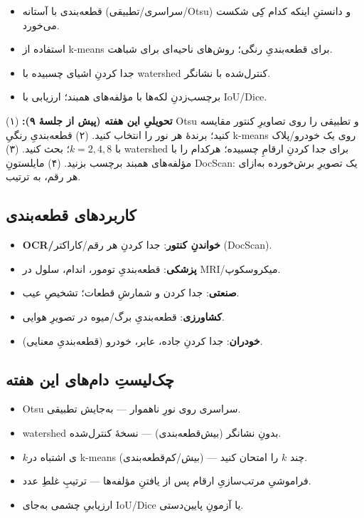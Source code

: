 \documentclass[12pt,a4paper]{article}
\begin{document}
\begin{itemize}
  \item قطعه‌بندی با آستانه (سراسری/تطبیقی/Otsu) و دانستنِ اینکه کدام کِی شکست می‌خورد.
  \item استفاده از k-means برای قطعه‌بندیِ رنگی؛ روش‌های ناحیه‌ای برای شباهت.
  \item جدا کردنِ اشیای چسبیده با watershedِ کنترل‌شده با نشانگر.
  \item برچسب‌زدنِ لکه‌ها با مؤلفه‌های همبند؛ ارزیابی با IoU/Dice.
\end{itemize}

\begin{tamrin}
\textbf{تحویلیِ این هفته (پیش از جلسهٔ ۹):} (۱) Otsu و تطبیقی را روی تصاویرِ کنتور مقایسه کنید؛
برندهٔ هر نور را انتخاب کنید. (۲) قطعه‌بندیِ رنگیِ k-means روی یک خودرو/پلاک با $k=2,4,8$؛ بحث
کنید. (۳) watershed برای جدا کردنِ ارقامِ چسبیده؛ هرکدام را با مؤلفه‌های همبند برچسب بزنید. (۴)
مایلستونِ DocScan: یک تصویرِ برش‌خورده به‌ازای هر رقم، به ترتیب.
\end{tamrin}

\subsection*{کاربردهای قطعه‌بندی}

\begin{itemize}
  \item \textbf{OCR/خواندنِ کنتور}: جدا کردنِ هر رقم/کاراکتر (DocScan).
  \item \textbf{پزشکی}: قطعه‌بندیِ تومور، اندام، سلول در MRI/میکروسکوپ.
  \item \textbf{صنعتی}: جدا کردن و شمارشِ قطعات؛ تشخیصِ عیب.
  \item \textbf{کشاورزی}: قطعه‌بندیِ برگ/میوه در تصویرِ هوایی.
  \item \textbf{خودران}: جدا کردنِ جاده، عابر، خودرو (قطعه‌بندیِ معنایی).
\end{itemize}

\subsection*{چک‌لیستِ دام‌های این هفته}

\begin{itemize}
  \item Otsuِ سراسری روی نورِ ناهموار — به‌جایش تطبیقی.
  \item watershed بدونِ نشانگر (بیش‌قطعه‌بندی) — نسخهٔ کنترل‌شده.
  \item $k$ی اشتباه در k-means (بیش/کم‌قطعه‌بندی) — چند $k$ را امتحان کنید.
  \item فراموشیِ مرتب‌سازیِ ارقام پس از یافتنِ مؤلفه‌ها — ترتیبِ غلطِ عدد.
  \item ارزیابیِ چشمی به‌جای IoU/Dice یا آزمونِ پایین‌دستی.
\end{itemize}
\end{document}
